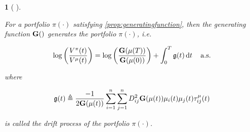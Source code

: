 \documentclass[british]{amsart} \usepackage{lmodern}
\numberwithin{equation}{section} \numberwithin{figure}{section}
\theoremstyle{plain} \newtheorem{thm}{\protect\theoremname}[section]
\theoremstyle{definition} \newtheorem{defn}[thm]{\protect\definitionname}
\theoremstyle{plain} \newtheorem{assumption}[thm]{\protect\assumptionname}
\theoremstyle{plain} \newtheorem{lem}[thm]{\protect\lemmaname}
\theoremstyle{plain} \newtheorem{prop}[thm]{\protect\propositionname}
\theoremstyle{remark} \newtheorem{rem}[thm]{\protect\remarkname}
\theoremstyle{plain} \newtheorem{cor}[thm]{\protect\corollaryname}
\renewcommand{\d}[1]{\mathop{\mathrm{d}{#1}}}
\begin{document}
\begin{lem} 
  [
    {\cite[Theorem 3.1]{\fernholz1999pgf}}
    Fernholz's Master Equation
  ]

  \label{lem:lemmamasterequation}

  For a portfolio $\pi(\cdot)$ satisfying \ref{prop:generatingfunction}, then the
  generating function $\mathbf{G}()$ generates the portfolio $\pi(\cdot)$, i.e.

  \begin{equation}
    \label{eq:masterequation}
    \log \left( \frac{V^{\pi}(t)}{V^{\mu}(t)} \right) = 
    \log \left( \frac{\G{\mu(T)}}{\G{\mu(0)}} \right) + 
      \int_{0}^{T} \g \d{t}
    \quad \almostsurely
  \end{equation}

  where 

  \begin{equation}
    \label{eq:eqdefg}
    \mathfrak{g}(t) \triangleq \frac{-1}{2 \mathbf{G}(\mu(t))}
        \sum_{i=1}^{n} \sum_{j=1}^{n} D_{ij}^{2} \mathbf{G}(\mu(t)) 
        \mu_{i}(t) \mu_{j}(t)
        \tau_{ij}^{\mu}(t)
  \end{equation}

  is called the \textit{drift process} of the portfolio $\pi(\cdot)$.

\end{lem}
\end{document}
